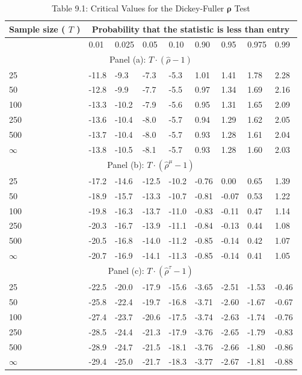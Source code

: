 \documentclass[10pt]{article}
\begin{document}
\begin{table}[h]
\begin{center}
\captionsetup{labelformat=empty}
\caption{Table 9.1: Critical Values for the Dickey-Fuller $\boldsymbol{\rho}$ Test}
\begin{tabular}{|l|l|l|l|l|l|l|l|l|}
\hline
\multirow{2}{*}{Sample size ( $T$ )} & \multicolumn{8}{|c|}{Probability that the statistic is less than entry} \\
\hline
 & 0.01 & 0.025 & 0.05 & 0.10 & 0.90 & 0.95 & 0.975 & 0.99 \\
\hline
\multicolumn{9}{|c|}{Panel (a): $T \cdot(\hat{\rho}-1)$} \\
\hline
25 & -11.8 & -9.3 & -7.3 & -5.3 & 1.01 & 1.41 & 1.78 & 2.28 \\
\hline
50 & -12.8 & -9.9 & -7.7 & -5.5 & 0.97 & 1.34 & 1.69 & 2.16 \\
\hline
100 & -13.3 & -10.2 & -7.9 & -5.6 & 0.95 & 1.31 & 1.65 & 2.09 \\
\hline
250 & -13.6 & -10.4 & -8.0 & -5.7 & 0.94 & 1.29 & 1.62 & 2.05 \\
\hline
500 & -13.7 & -10.4 & -8.0 & -5.7 & 0.93 & 1.28 & 1.61 & 2.04 \\
\hline
$\infty$ & -13.8 & -10.5 & -8.1 & -5.7 & 0.93 & 1.28 & 1.60 & 2.03 \\
\hline
\multicolumn{9}{|c|}{Panel (b): $T \cdot\left(\hat{\rho}^{\mu}-1\right)$} \\
\hline
25 & -17.2 & -14.6 & -12.5 & -10.2 & -0.76 & 0.00 & 0.65 & 1.39 \\
\hline
50 & -18.9 & -15.7 & -13.3 & -10.7 & -0.81 & -0.07 & 0.53 & 1.22 \\
\hline
100 & -19.8 & -16.3 & -13.7 & -11.0 & -0.83 & -0.11 & 0.47 & 1.14 \\
\hline
250 & -20.3 & -16.7 & -13.9 & -11.1 & -0.84 & -0.13 & 0.44 & 1.08 \\
\hline
500 & -20.5 & -16.8 & -14.0 & -11.2 & -0.85 & -0.14 & 0.42 & 1.07 \\
\hline
$\infty$ & -20.7 & -16.9 & -14.1 & -11.3 & -0.85 & -0.14 & 0.41 & 1.05 \\
\hline
\multicolumn{9}{|c|}{Panel (c): $T \cdot\left(\hat{\rho}^{\tau}-1\right)$} \\
\hline
25 & -22.5 & -20.0 & -17.9 & -15.6 & -3.65 & -2.51 & -1.53 & -0.46 \\
\hline
50 & -25.8 & -22.4 & -19.7 & -16.8 & -3.71 & -2.60 & -1.67 & -0.67 \\
\hline
100 & -27.4 & -23.7 & -20.6 & -17.5 & -3.74 & -2.63 & -1.74 & -0.76 \\
\hline
250 & -28.5 & -24.4 & -21.3 & -17.9 & -3.76 & -2.65 & -1.79 & -0.83 \\
\hline
500 & -28.9 & -24.7 & -21.5 & -18.1 & -3.76 & -2.66 & -1.80 & -0.86 \\
\hline
$\infty$ & -29.4 & -25.0 & -21.7 & -18.3 & -3.77 & -2.67 & -1.81 & -0.88 \\
\hline
\end{tabular}
\end{center}
\end{table}
\end{document}
